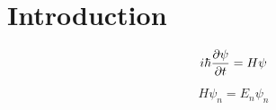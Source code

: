 \section{Introduction}

\begin{equation}\label{eq:SE}
i\hbar\pdv{\psi}{t} = H\psi
\end{equation}

\begin{equation} 
\label{eq:TISE}
H\psi_n = E_n\psi_n 
\end{equation}